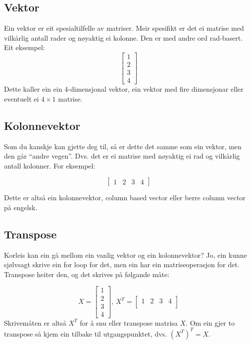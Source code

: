 \documentclass[12pt]{article}
\newcommand\x{\times}
\begin{document}
\subsection*{Vektor}

Ein vektor er eit spesialtilfelle av matriser.
Meir spesifikt er det ei matrise med vilkårlig antall
rader og nøyaktig ei kolonne. Den er med andre ord rad-basert.
Eit eksempel:
\begin{equation*}
\left[\begin{array}{c}
1 \\
2 \\
3 \\
4
\end{array}\right]
\end{equation*}
Dette kaller ein ein 4-dimensjonal vektor,
ein vektor med fire dimensjonar eller eventuelt ei $4 \x 1$ matrise.

\subsection*{Kolonnevektor}

Som du kanskje kan gjette deg til, så er dette det samme som ein vektor,
men den går ``andre vegen''. Dvs. det er ei matrise med nøyaktig ei rad
og vilkårlig antall kolonner. For eksempel:

\begin{equation*}
\left[\begin{array}{cccc}
1 & 2 & 3 & 4
\end{array}\right]
\end{equation*}

Dette er altså ein kolonnevektor, 
column based vector eller
berre column vector på engelsk.

\subsection*{Transpose}

Korleis kan ein gå mellom ein vanlig vektor og ein kolonnevektor?
Jo, ein kunne sjølvsagt skrive ein for loop for det, men ein har
ein matriseoperasjon for det. Transpose heiter den, og det skrives
på følgande måte:

\begin{equation*}
X = \left[\begin{array}{cccc}
1 \\
2 \\
3 \\
4
\end{array}\right]\text{, }
X^T = \left[\begin{array}{cccc}
1 & 2 & 3 & 4\\
\end{array}\right]
\end{equation*}
Skrivemåten er altså $X^T$ for å snu eller transpose matrisa $X$.
Om ein gjer to transpose så kjem ein tilbake til utgangspunktet, dvs.
$\left(X^T\right)^T = X$.
\end{document}
